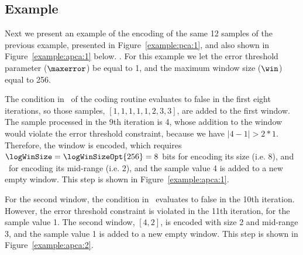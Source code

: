 




\vspace{-10pt}
\subsection{Example}
\label{algo:apca:example}
\newcommand{\APCACodeOne}{4}
\newcommand{\APCACodeTwo}{11}
\newcommand{\exampleIntroFirst}[1]{Next we present an example of the encoding of the same 12 samples of previous examples, presented in Figure~\ref{example:pca:1}, and also shown in Figure~#1 below}


Next we present an example of the encoding of the same 12 samples of the previous example, presented in Figure~\ref{example:pca:1}, and also shown in Figure~\ref{example:apca:1} below. . For this example we let the error threshold parameter ($\maxerror$) be equal to 1, and the maximum window size ($\win$) equal to 256. 


The condition in \Line \APCACodeOne\ of the coding routine evaluates to false in the first eight iterations, so those samples, $[1, 1, 1, 1, 1, 2, 3, 3]$, are added to the first window. The sample processed in the 9th iteration is 4, whose addition to the window would violate the error threshold constraint, because we have $|4 - 1| > 2*1$. Therefore, the window is encoded, which requires $\logWinSize = \logWinSizeOpt{256}=8$ bits for encoding its size (i.e. 8), and \tobitexp\ for encoding its mid-range (i.e. 2), and the sample value 4 is added to a new empty window. This step is shown in Figure~\ref{example:apca:1}.




For the second window, the condition in \Line \APCACodeOne\ evaluates to false in the 10th iteration. However, the error threshold constraint is violated in the 11th iteration, for the sample value 1. The second window, $[4, 2]$, is encoded with size 2 and mid-range 3, and the sample value 1 is added to a new empty window. This step is shown in Figure~\ref{example:apca:2}.




